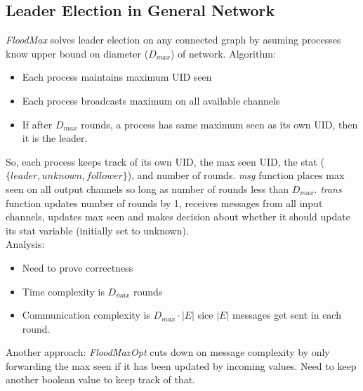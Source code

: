 \documentclass[a4paper,10pt,]{article}
\begin{document}
\subsection{Leader Election in General Network}
\emph{FloodMax} solves leader election on any connected graph by asuming processes know upper bound on diameter ($D_{max}$) of network.
Algorithm:
\begin{itemize}
  \item Each process maintains maximum UID seen
  \item Each process broadcasts maximum on all available channels
  \item If after $D_{max}$ rounds, a process has same maximum seen as its own UID, then it is the leader.
\end{itemize}
So, each process keeps track of its own UID, the max seen UID, the stat ($\{leader, unknown, follower\}$), and number of rounds.  \emph{msg} function places max seen on all output channels so long as number of rounds less than $D_{max}$.  \emph{trans} function updates number of rounds by 1, receives messages from all input channels, updates max seen and makes decision about whether it should update its stat variable (initially set to unknown). \\
Analysis:
\begin{itemize}
  \item Need to prove correctness
  \item Time complexity is $D_{max}$ rounds
  \item Communication complexity is $D_{max} \cdot |E|$ sice $|E|$ messages get sent in each round.
\end{itemize}
Another approach: \emph{FloodMaxOpt} cuts down on message complexity by only forwarding the max seen if it has been updated by incoming values.  Need to keep another boolean value to keep track of that.
\end{document}
